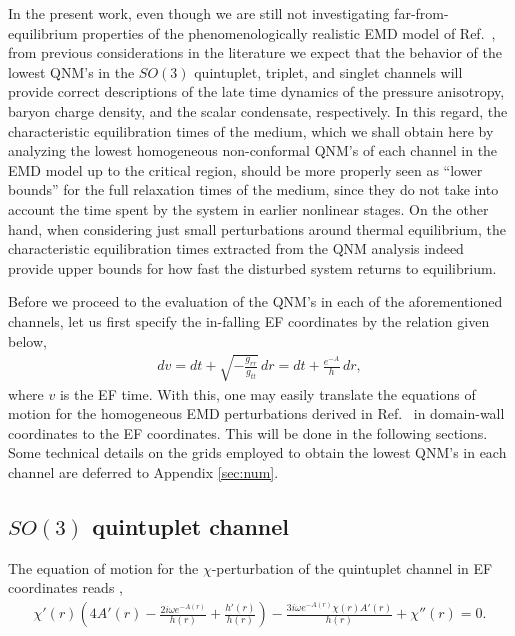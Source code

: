 \documentclass[aps,prd,showkeys,superscriptaddress,singlecolumn,nofootinbib,floatfix]{revtex4-1}
\begin{document}
In the present work, even though we are still not investigating far-from-equilibrium properties of the phenomenologically realistic EMD model of Ref.\ \cite{Critelli:2017oub}, from previous considerations in the literature we expect that the behavior of the lowest QNM's in the $SO(3)$ quintuplet, triplet, and singlet channels will provide correct descriptions of the late time dynamics of the pressure anisotropy, baryon charge density, and the scalar condensate, respectively. In this regard, the characteristic equilibration times of the medium, which we shall obtain here by analyzing the lowest homogeneous non-conformal QNM's of each channel in the EMD model up to the critical region, should be more properly seen as ``lower bounds'' for the full relaxation times of the medium, since they do not take into account the time spent by the system in earlier nonlinear stages. On the other hand, when considering just small perturbations around thermal equilibrium, the characteristic equilibration times extracted from the QNM analysis indeed provide upper bounds for how fast the disturbed system returns to equilibrium.

Before we proceed to the evaluation of the QNM's in each of the aforementioned channels, let us first specify the in-falling EF coordinates by the relation given below,
\begin{align}
dv = dt + \sqrt{-\frac{g_{rr}}{g_{tt}}}\,dr = dt + \frac{e^{-A}}{h}\,dr,
\end{align}
where $v$ is the EF time. With this, one may easily translate the equations of motion for the homogeneous EMD perturbations derived in Ref.\ \cite{DeWolfe:2011ts} in domain-wall coordinates to the EF coordinates. This will be done in the following sections. Some technical details on the grids employed to obtain the lowest QNM's in each channel are deferred to Appendix \ref{sec:num}.


\subsection{$SO(3)$ quintuplet channel}
\label{sec:5et}

The equation of motion for the $\chi$-perturbation of the quintuplet channel in EF coordinates reads \cite{Rougemont:2015wca},
\begin{align}
\chi '(r) \left(4 A'(r)-\frac{2 i \omega  e^{-A(r)}}{h(r)}+\frac{h'(r)}{h(r)}\right)-\frac{3 i \omega  e^{-A(r)} \chi (r) A'(r)}{h(r)}+\chi ''(r) = 0.
\label{eq:eom5et}
\end{align}
\end{document}
